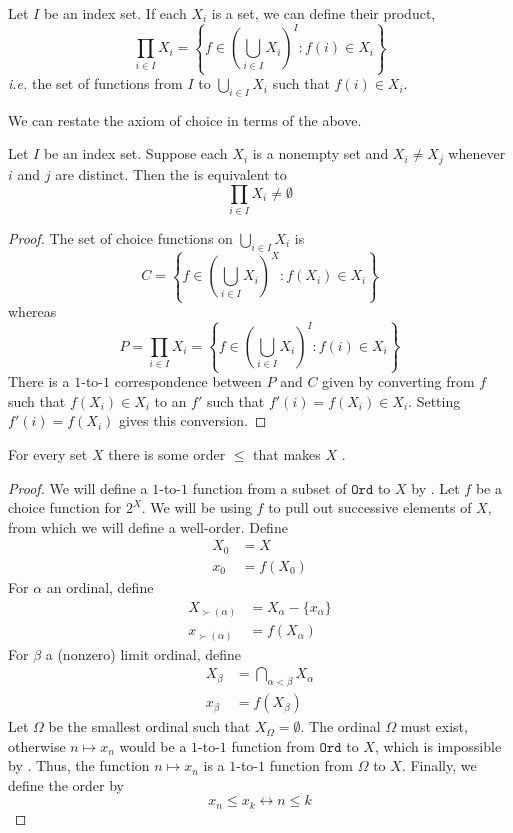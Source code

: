 \documentclass{scrbook}
\renewcommand{\iff}{\leftrightarrow}
\newcommand{\ie}{\emph{i.e.}\xspace}
\newcommand{\ord}{\mathtt{Ord}}
\begin{document}
\begin{defn}
  Let $I$ be an index set. If each $X_i$ is a set, we can define their product,
  \[
  \prod_{i\in I} X_i=\left\{f\in\left(\bigcup_{i\in I} X_i\right)^I: f(i)\in X_i\right\}
  \]
  \ie the set of functions from $I$ to $\bigcup_{i\in I} X_i$ such that $f(i)\in X_i$. 
\end{defn}
We can restate the axiom of choice in terms of the above.
\begin{theorem}
  Let $I$ be an index set. Suppose each $X_i$ is a nonempty set and $X_i\neq X_j$ whenever $i$ and $j$ are distinct. Then the  is equivalent to
  \begin{equation}
    \prod_{i\in I} X_i\neq \emptyset
    \label{eq:nonempty-prod}
  \end{equation}
\end{theorem}
\begin{proof}
The set of choice functions on $\bigcup_{i\in I} X_i$ is 
  \[
  C=\left\{f\in \left(\bigcup_{i\in I} X_i\right)^X: f(X_i)\in X_i\right\}
  \]
  whereas
  \[
  P=\prod_{i\in I} X_i = \left\{f\in\left(\bigcup_{i\in I} X_i\right)^I: f(i) \in X_i\right\}
  \]
  There is a $1$-to-$1$ correspondence between $P$ and $C$ given by converting from $f$ such that $f(X_i)\in X_i$ to an $f'$ such that $f'(i)=f(X_i)\in X_i$. Setting $f'(i)=f(X_i)$ gives this conversion.
\end{proof}

\begin{theorem}\label{th:well-ordering}
  For every set $X$ there is some order $\leq$ that makes $X$ . 
\end{theorem}
\begin{proof}
  We will define a $1$-to-$1$ function from a subset of $\ord$ to $X$ by . Let $f$ be a choice function for $2^X$. We will be using $f$ to pull out successive elements of $X$, from which we will define a well-order. Define
  \begin{align*}
    X_0 &= X \\
    x_0 &= f(X_0)
  \end{align*}
  For $\alpha$ an ordinal, define 
  \begin{align*}
    X_{\succ(\alpha)} &= X_\alpha-\{x_\alpha\} \\
    x_{\succ(\alpha)} &= f(X_\alpha)
  \end{align*}
  For $\beta$ a (nonzero) limit ordinal, define 
  \begin{align*}
    X_\beta &= \bigcap_{\alpha < \beta} X_\alpha \\
    x_\beta &=f(X_\beta)
  \end{align*}
  Let $\Omega$ be the smallest ordinal such that $X_\Omega=\emptyset$. The ordinal $\Omega$ must exist, otherwise $n\mapsto x_n$ would be a $1$-to-$1$ function from $\ord$ to $X$, which is impossible by . Thus, the function $n\mapsto x_n$ is a $1$-to-$1$ function from $\Omega$ to $X$. Finally, we define the order by 
  \[
  x_n \leq x_k \iff n \leq k
  \]
\end{proof}
\end{document}
